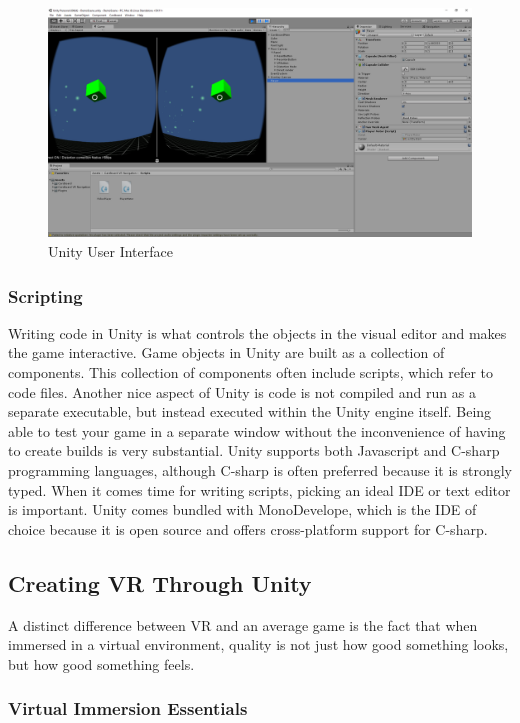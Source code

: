 \documentclass[12pt]{article}
\begin{document}
\begin{figure}[h]
    \centering
 \includegraphics[width=.7\textwidth]{DemoSoftware2}
  \caption{Unity User Interface}
  \label{fig:UnityUI}
 \end{figure}

\subsubsection{Scripting}

\par Writing code in Unity is what controls the objects in the visual editor and makes the game interactive. Game objects in Unity are built as a collection of components. This collection of components often include scripts, which refer to code files. Another nice aspect of Unity is code is not compiled and run as a separate executable, but instead executed within the Unity engine itself. Being able to test your game in a separate window without the inconvenience of having to create builds is very substantial. Unity supports both Javascript and C-sharp programming languages, although C-sharp is often preferred because it is strongly typed. When it comes time for writing scripts, picking an ideal IDE or text editor is important. Unity comes bundled with MonoDevelope, which is the IDE of choice because it is open source and offers cross-platform support for C-sharp. 

\subsection{Creating VR Through Unity}

A distinct difference between VR and an average game is the fact that when immersed in a virtual environment, quality is not just how good something looks, but how good something feels. 

\subsubsection{Virtual Immersion Essentials} 
\end{document}
